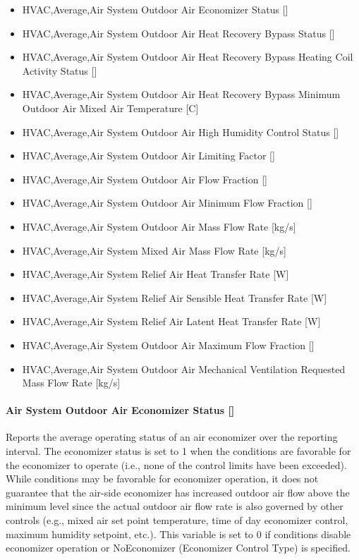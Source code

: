 \begin{itemize}
\item
  HVAC,Average,Air System Outdoor Air Economizer Status {[]}
\item
  HVAC,Average,Air System Outdoor Air Heat Recovery Bypass Status {[]}
\item
  HVAC,Average,Air System Outdoor Air Heat Recovery Bypass Heating Coil Activity Status {[]}
\item
  HVAC,Average,Air System Outdoor Air Heat Recovery Bypass Minimum Outdoor Air Mixed Air Temperature {[}C{]}
\item
  HVAC,Average,Air System Outdoor Air High Humidity Control Status {[]}
\item
  HVAC,Average,Air System Outdoor Air Limiting Factor {[]}
\item
  HVAC,Average,Air System Outdoor Air Flow Fraction {[]}
\item
  HVAC,Average,Air System Outdoor Air Minimum Flow Fraction {[]}
\item
  HVAC,Average,Air System Outdoor Air Mass Flow Rate {[}kg/s{]}
\item
  HVAC,Average,Air System Mixed Air Mass Flow Rate {[}kg/s{]}
\item
  HVAC,Average,Air System Relief Air Heat Transfer Rate {[}W{]}
\item
  HVAC,Average,Air System Relief Air Sensible Heat Transfer Rate {[}W{]}
\item
  HVAC,Average,Air System Relief Air Latent Heat Transfer Rate {[}W{]}
\item
  HVAC,Average,Air System Outdoor Air Maximum Flow Fraction {[]}
\item
  HVAC,Average,Air System Outdoor Air Mechanical Ventilation Requested Mass Flow Rate {[}kg/s{]}
\end{itemize}

\paragraph{Air System Outdoor Air Economizer Status {[]}}\label{air-system-outdoor-air-economizer-status}

Reports the average operating status of an air economizer over the reporting interval. The economizer status is set to 1 when the conditions are favorable for the economizer to operate (i.e., none of the control limits have been exceeded). While conditions may be favorable for economizer operation, it does not guarantee that the air-side economizer has increased outdoor air flow above the minimum level since the actual outdoor air flow rate is also governed by other controls (e.g., mixed air set point temperature, time of day economizer control, maximum humidity setpoint, etc.). This variable is set to 0 if conditions disable economizer operation or NoEconomizer (Economizer Control Type) is specified.

